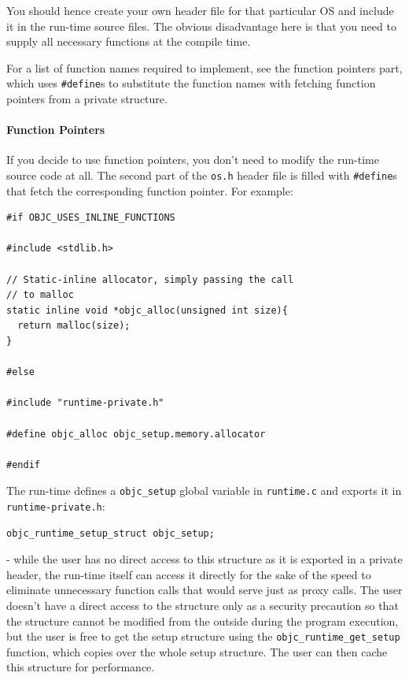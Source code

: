 You should hence create your own header file for that particular OS and include it in the run-time source files. The obvious disadvantage here is that you need to supply all necessary functions at the compile time.

For a list of function names required to implement, see the function pointers part, which uses \verb=#define=s to substitute the function names with fetching function pointers from a private structure.

\paragraph{Function Pointers}

If you decide to use function pointers, you don't need to modify the run-time source code at all. The second part of the \verb=os.h= header file is filled with \verb=#define=s that fetch the corresponding function pointer. For example:

\begin{verbatim}
#if OBJC_USES_INLINE_FUNCTIONS

#include <stdlib.h>

// Static-inline allocator, simply passing the call
// to malloc
static inline void *objc_alloc(unsigned int size){
  return malloc(size);
}

#else

#include "runtime-private.h"

#define objc_alloc objc_setup.memory.allocator

#endif

\end{verbatim}

The run-time defines a \verb=objc_setup= global variable in \verb=runtime.c= and exports it in \verb=runtime-private.h=:
 
\begin{verbatim}
objc_runtime_setup_struct objc_setup;
\end{verbatim}

- while the user has no direct access to this structure as it is exported in a private header, the run-time itself can access it directly for the sake of the speed to eliminate unnecessary function calls that would serve just as proxy calls. The user doesn't have a direct access to the structure only as a security precaution so that the structure cannot be modified from the outside during the program execution, but the user is free to get the setup structure using the \verb=objc_runtime_get_setup= function, which copies over the whole setup structure. The user can then cache this structure for performance.

